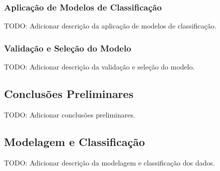 \documentclass[conference]{IEEEtran}
\begin{document}
\subsubsection{Aplicação de Modelos de Classificação}
TODO: Adicionar descrição da aplicação de modelos de classificação.






\subsubsection{Validação e Seleção do Modelo}
TODO: Adicionar descrição da validação e seleção do modelo.


\subsection{Conclusões Preliminares}
TODO: Adicionar conclusões preliminares.


\subsection{Modelagem e Classificação}
TODO: Adicionar descrição da modelagem e classificação dos dados.
\end{document}

